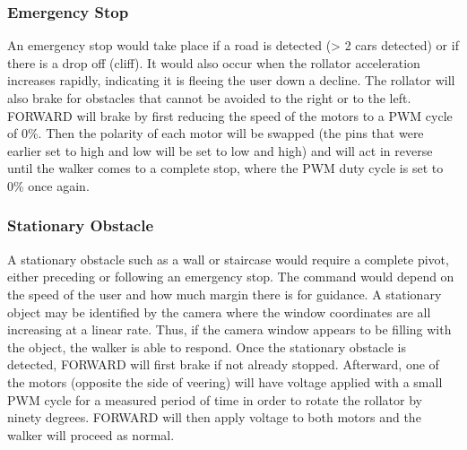 \subsubsection{Emergency Stop}
\noindent An emergency stop would take place if a road is detected (> 2 cars detected) or if there is a drop off (cliff). It would also occur when the rollator acceleration increases rapidly, indicating it is fleeing the user down a decline. The rollator will also brake for obstacles that cannot be avoided to the right or to the left. FORWARD will brake by first reducing the speed of the motors to a PWM cycle of 0\%. Then the polarity of each motor will be swapped (the pins that were earlier set to high and low will be set to low and high) and will act in reverse until the walker comes to a complete stop, where the PWM duty cycle is set to 0\% once again.

\subsubsection{Stationary Obstacle}
\noindent A stationary obstacle such as a wall or staircase would require a complete pivot, either preceding or following an emergency stop. The command would depend on the speed of the user and how much margin there is for guidance. A stationary object may be identified by the camera where the window coordinates are all increasing at a linear rate. Thus, if the camera window appears to be filling with the object, the walker is able to respond. Once the stationary obstacle is detected, FORWARD will first brake if not already stopped. Afterward, one of the motors (opposite the side of veering) will have voltage applied with a small PWM cycle for a measured period of time in order to rotate the rollator by ninety degrees. FORWARD will then apply voltage to both motors and the walker will proceed as normal.

